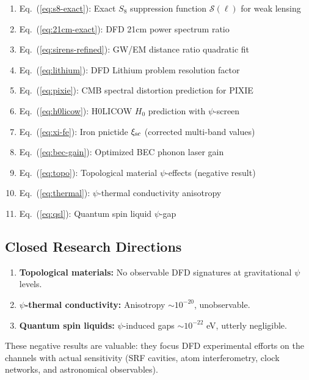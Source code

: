 \documentclass[11pt]{article}
\begin{document}
\begin{enumerate}
\item Eq.~(\ref{eq:s8-exact}): Exact $S_8$ suppression function $\mathcal{S}(\ell)$ for weak lensing
\item Eq.~(\ref{eq:21cm-exact}): DFD 21cm power spectrum ratio
\item Eq.~(\ref{eq:sirens-refined}): GW/EM distance ratio quadratic fit
\item Eq.~(\ref{eq:lithium}): DFD Lithium problem resolution factor
\item Eq.~(\ref{eq:pixie}): CMB spectral distortion prediction for PIXIE
\item Eq.~(\ref{eq:h0licow}): H0LICOW $H_0$ prediction with $\psi$-screen
\item Eq.~(\ref{eq:xi-fe}): Iron pnictide $\xi_{\rm sc}$ (corrected multi-band values)
\item Eq.~(\ref{eq:bec-gain}): Optimized BEC phonon laser gain
\item Eq.~(\ref{eq:topo}): Topological material $\psi$-effects (negative result)
\item Eq.~(\ref{eq:thermal}): $\psi$-thermal conductivity anisotropy
\item Eq.~(\ref{eq:qsl}): Quantum spin liquid $\psi$-gap
\end{enumerate}

\subsection*{Closed Research Directions}

\begin{enumerate}
\item \textbf{Topological materials:} No observable DFD signatures at gravitational $\psi$ levels.
\item \textbf{$\psi$-thermal conductivity:} Anisotropy $\sim 10^{-20}$, unobservable.
\item \textbf{Quantum spin liquids:} $\psi$-induced gaps $\sim 10^{-22}$ eV, utterly negligible.
\end{enumerate}

These negative results are valuable: they focus DFD experimental efforts on the channels with actual sensitivity (SRF cavities, atom interferometry, clock networks, and astronomical observables).
\end{document}

